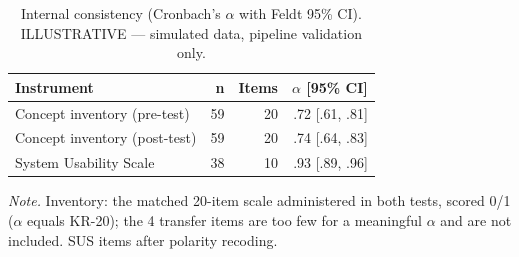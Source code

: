 \begin{table}[htbp]
\centering
\small
\caption{Internal consistency (Cronbach's $\alpha$ with Feldt 95\% CI). ILLUSTRATIVE — simulated data, pipeline validation only.}
\label{tab:T15}
\begin{tabular}{lrrr}
\toprule
Instrument & n & Items & $\alpha$ [95\% CI] \\
\midrule
Concept inventory (pre-test) & 59 & 20 & .72 [.61, .81] \\
Concept inventory (post-test) & 59 & 20 & .74 [.64, .83] \\
System Usability Scale & 38 & 10 & .93 [.89, .96] \\
\bottomrule
\end{tabular}
\par\smallskip\footnotesize\textit{Note.} Inventory: the matched 20-item scale administered in both tests, scored 0/1 ($\alpha$ equals KR-20); the 4 transfer items are too few for a meaningful $\alpha$ and are not included. SUS items after polarity recoding.
\end{table}
